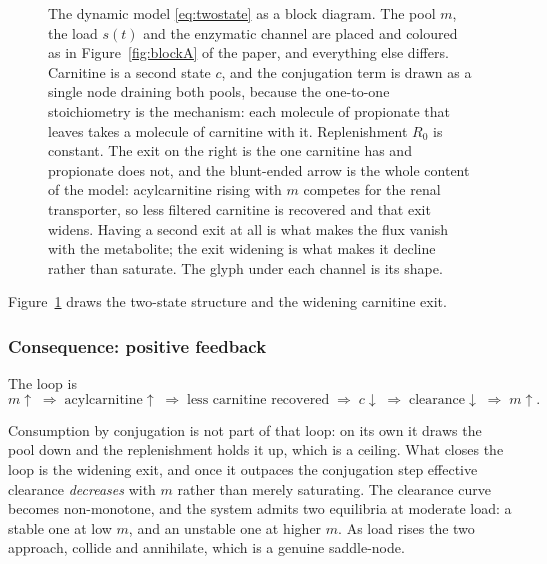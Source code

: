 \begin{figure}[!htbp]
{}
\caption{The dynamic model \eqref{eq:twostate} as a block diagram. The pool $m$, the load $s(t)$
and the enzymatic channel are placed and coloured as in Figure~\ref{fig:blockA} of the
paper, and
everything else differs. Carnitine is a second state $c$, and the conjugation term is drawn
as a single node draining both pools, because the one-to-one stoichiometry is the
mechanism: each molecule of propionate that leaves takes a molecule of carnitine with it.
Replenishment $R_0$ is constant. The exit on the right is the one carnitine has and
propionate does not, and the blunt-ended arrow is the whole content of the model:
acylcarnitine rising with $m$ competes for the renal transporter, so less filtered carnitine
is recovered and that exit widens. Having a second exit at all is what makes the flux vanish
with the metabolite; the exit widening is what makes it decline rather than saturate. The
glyph under each channel is its shape.}
\label{fig:blockC}
\end{figure}

Figure~\ref{fig:blockC} draws the two-state structure and the widening carnitine exit.

\subsubsection{Consequence: positive feedback}

The loop is
\[
m \uparrow \;\Longrightarrow\; \text{acylcarnitine} \uparrow \;\Longrightarrow\;
\text{less carnitine recovered} \;\Longrightarrow\;
c \downarrow \;\Longrightarrow\; \text{clearance} \downarrow \;\Longrightarrow\; m \uparrow.
\]

Consumption by conjugation is not part of that loop: on its own it draws the pool down and
the replenishment holds it up, which is a ceiling. What closes the loop is the widening exit,
and once it outpaces the conjugation step effective clearance \emph{decreases} with $m$
rather than merely saturating. The clearance curve becomes non-monotone, and the system admits
two equilibria at moderate load: a stable one at low $m$, and an unstable one at
higher $m$. As load rises the two approach, collide and annihilate, which is a genuine
saddle-node.

